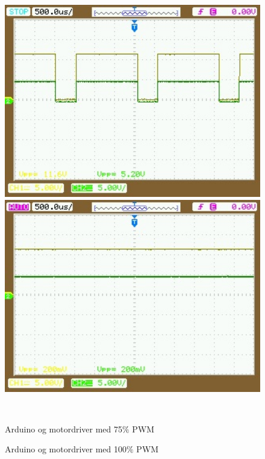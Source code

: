  \begin{figure}[htbp] \centering
\begin{minipage}[b]{0.48\textwidth} \centering
\includegraphics[width=1.00\textwidth]{billeder/Hardware/motor75PWM.jpg} %
\end{minipage} \hfill
\begin{minipage}[b]{0.48\textwidth} \centering
\includegraphics[width=1.00\textwidth]{billeder/Hardware/motor100PWM.jpg} %
\end{minipage} \\ %
\begin{minipage}[t]{0.48\textwidth}
\caption{Arduino og motordriver med 75$\%$ PWM} %
\label{fig:75PWM}
\end{minipage} \hfill
\begin{minipage}[t]{0.48\textwidth}
\caption{Arduino og motordriver med 100$\%$ PWM} %
\label{fig:100PWM}
\end{minipage}
\end{figure}

